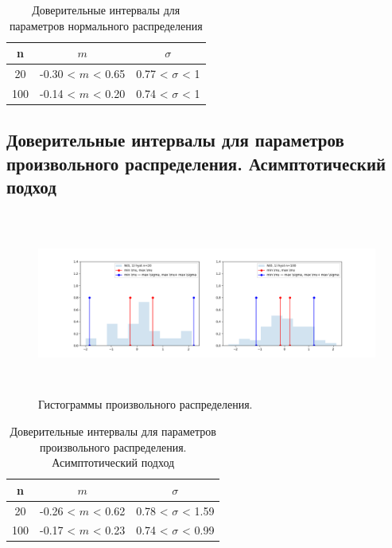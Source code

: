 \documentclass[../main.tex]{subfiles}
\begin{document}
	\begin{table}[H]
	    \centering
	    \begin{tabular}{| c | c | c |}
	    \hline
	       n    &  $m$  & $\sigma$\\ \hline
	        20  & -0.30 < $m$ < 0.65 & 0.77 < $\sigma$ < 1 \\ \hline
	       100   & -0.14 < $m$ < 0.20 & 0.74 < $\sigma$ < 1 \\
	   \hline
	    \end{tabular}
	    \caption{Доверительные интервалы для параметров нормального распределения}
	    \label{tab:interv_simple}
	\end{table}
	
\subsection{Доверительные интервалы для параметров произвольного распределения. Асимптотический подход}
    \begin{figure}[H]
		\centering
			\includegraphics[width = 20cm, height = 6cm]{figures/asymp.png}
		\caption{Гистограммы произвольного распределения.}
		\label{w_pert}
	\end{figure}
	\begin{table}[H]
	    \centering
	    \begin{tabular}{| c | c | c |}
	    \hline
	       n    &  $m$  & $\sigma$\\ \hline
	        20  &  -0.26 < $m$ < 0.62 & 0.78 < $\sigma$ < 1.59 \\ \hline
	       100   &  -0.17 < $m$ < 0.23 & 0.74 < $\sigma$ < 0.99 \\
	   \hline
	    \end{tabular}
	    \caption{Доверительные интервалы для параметров произвольного распределения. Асимптотический подход}
	    \label{tab:interv_asimpt}
	\end{table}
\end{document}
